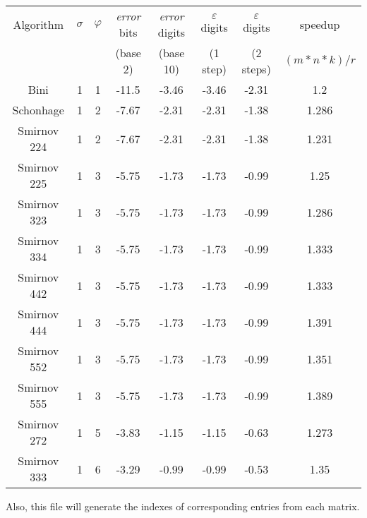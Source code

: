\documentclass{article}
\begin{document}
\begin{center}
 \begin{tabular}{||c c c c c c c c||} 
 \hline
 Algorithm & $\sigma$ & $\varphi$ & \textit{error} bits & \textit{error} digits & $\varepsilon$ digits & $\varepsilon$ digits & speedup \\
  & & & (base 2) & (base 10) & (1 step) & (2 steps) & $(m*n*k)/r$\\ [0.5ex] 
 \hline\hline
 Bini & 1 & 1 & -11.5 & -3.46 & -3.46 & -2.31 & 1.2\\
 \hline
 Schonhage & 1 & 2 & -7.67 & -2.31 & -2.31 & -1.38 & 1.286\\
 \hline
 Smirnov 224 & 1 & 2 & -7.67 & -2.31 & -2.31 & -1.38 & 1.231\\
 \hline
 Smirnov 225 & 1 & 3 & -5.75 & -1.73 & -1.73 & -0.99 & 1.25\\
 \hline
 Smirnov 323 & 1 & 3 & -5.75 & -1.73 & -1.73 & -0.99 & 1.286\\
 \hline
 Smirnov 334 & 1 & 3 & -5.75 & -1.73 & -1.73 & -0.99 & 1.333\\
 \hline
 Smirnov 442 & 1 & 3 & -5.75 & -1.73 & -1.73 & -0.99 & 1.333\\
 \hline
 Smirnov 444 & 1 & 3 & -5.75 & -1.73 & -1.73 & -0.99 & 1.391\\
 \hline
 Smirnov 552 & 1 & 3 & -5.75 & -1.73 & -1.73 & -0.99 & 1.351\\
 \hline
 Smirnov 555 & 1 & 3 & -5.75 & -1.73 & -1.73 & -0.99 & 1.389\\
 \hline
 Smirnov 272 & 1 & 5 & -3.83 & -1.15 & -1.15 & -0.63 & 1.273\\
 \hline
 Smirnov 333 & 1 & 6 & -3.29 & -0.99 & -0.99 & -0.53 & 1.35\\ [1ex] 
 \hline
\end{tabular}
\end{center}
Also, this file will generate the indexes of corresponding entries from each matrix.




\end{document}
